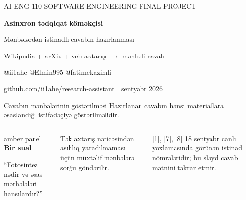 \documentclass[aspectratio=169,11pt]{beamer}
\newenvironment{amberpanel}{\begin{beamercolorbox}[wd=\linewidth,sep=1.2ex,rounded=true]{amber panel}}{\end{beamercolorbox}}
\newcommand{\lead}[1]{{\color{muted}\normalsize #1}\par\vspace{0.75em}}
\newcommand{\tinyref}[1]{{\color{muted}\scriptsize #1}}
\begin{document}
{
\begin{frame}[plain]
  \vspace{7mm}
  {\color{orange}\small AI-ENG-110 \quad SOFTWARE ENGINEERING FINAL PROJECT}\par
  \vspace{9mm}
  {\color{white}\fontsize{29}{33}\selectfont\bfseries Asinxron tədqiqat köməkçisi}\par
  \vspace{4mm}
  {\color{white}\Large Mənbələrdən istinadlı cavabın hazırlanması}\par
  \vspace{9mm}
  {\color{white}\normalsize Wikipedia + arXiv + veb axtarışı \quad $\longrightarrow$ \quad mənbəli cavab}\par
  \vfill
  {\color{white}\small @ii1ahe \quad @Elmin995 \quad @fatimekazimli}\par
  {\color{white!75}\scriptsize github.com/ii1ahe/research-assistant \quad |  sentyabr 2026}
\end{frame}}

\begin{frame}{Cavabın mənbələrinin göstərilməsi}
  \lead{Hazırlanan cavabın hansı materiallara əsaslandığı istifadəçiyə göstərilməlidir.}
  \begin{columns}[T,onlytextwidth]
      \begin{amberpanel}
        \textbf{Bir sual}\par\vspace{1mm}
        “Fotosintez nədir və əsas mərhələləri hansılardır?”
      \end{amberpanel}
      \vspace{3mm}
      \small Tək axtarış nəticəsindən asılılıq yaradılmaması üçün müxtəlif mənbələrə sorğu göndərilir.
      \par
      \vspace{1mm}
      \tinyref{[1], [7], [8] 18 sentyabr canlı yoxlamasında görünən istinad nömrələridir; bu slayd cavab mətnini təkrar etmir.}
  \end{columns}
\end{frame}
\end{document}
